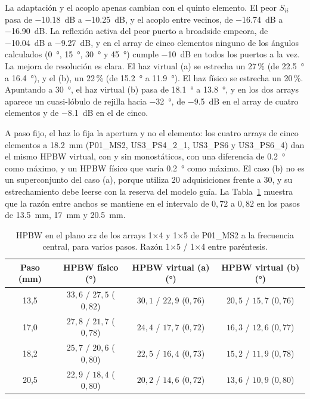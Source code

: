 \documentclass[11pt,a4paper]{article}
\begin{document}
La adaptación y el acoplo apenas cambian con el quinto elemento. El peor $S_{ii}$ pasa de \SI{-10.18}{dB} a \SI{-10.25}{dB}, y el acoplo entre vecinos, de \SI{-16.74}{dB} a \SI{-16.90}{dB}. La reflexión activa del peor puerto a broadside empeora, de \SI{-10.04}{dB} a \SI{-9.27}{dB}, y en el array de cinco elementos ninguno de los ángulos calculados (\SI{0}{\degree}, \SI{15}{\degree}, \SI{30}{\degree} y \SI{45}{\degree}) cumple \SI{-10}{dB} en todos los puertos a la vez. La mejora de resolución es clara. El haz virtual (a) se estrecha un 27\,\% (de \SI{22.5}{\degree} a \SI{16.4}{\degree}), y el (b), un 22\,\% (de \SI{15.2}{\degree} a \SI{11.9}{\degree}). El haz físico se estrecha un 20\,\%. Apuntando a \SI{30}{\degree}, el haz virtual (b) pasa de \SI{18.1}{\degree} a \SI{13.8}{\degree}, y en los dos arrays aparece un cuasi-lóbulo de rejilla hacia \SI{-32}{\degree}, de \SI{-9.5}{dB} en el array de cuatro elementos y de \SI{-8.1}{dB} en el de cinco.

A paso fijo, el haz lo fija la apertura y no el elemento: los cuatro arrays de cinco elementos a \SI{18.2}{mm} (P01\_MS2, US3\_PS4\_2\_1, US3\_PS6 y US3\_PS6\_4) dan el mismo HPBW virtual, con y sin monostáticos, con una diferencia de \SI{0.2}{\degree} como máximo, y un HPBW físico que varía \SI{0.2}{\degree} como máximo. El caso (b) no es un superconjunto del caso (a), porque utiliza 20 adquisiciones frente a 30, y su estrechamiento debe leerse con la reserva del modelo guía. La Tabla~\ref{tab:n_elementos_pasos} muestra que la razón entre anchos se mantiene en el intervalo de $0{,}72$ a $0{,}82$ en los pasos de \SI{13.5}{mm}, \SI{17}{mm} y \SI{20.5}{mm}.

\begin{table}[H]
    \centering
    \caption{HPBW en el plano $xz$ de los arrays 1$\times$4 y 1$\times$5 de P01\_MS2 a la frecuencia central, para varios pasos. Razón 1$\times$5 / 1$\times$4 entre paréntesis.}
    \label{tab:n_elementos_pasos}
    {\small
    \begin{tabular}{c c c c}
        \toprule
        Paso (\si{mm}) & HPBW físico (\si{\degree}) & HPBW virtual (a) (\si{\degree}) & HPBW virtual (b) (\si{\degree}) \\
        \midrule
        13,5 & $33{,}6$ / $27{,}5$ ($0{,}82$) & $30{,}1$ / $22{,}9$ ($0{,}76$) & $20{,}5$ / $15{,}7$ ($0{,}76$) \\
        17,0 & $27{,}8$ / $21{,}7$ ($0{,}78$) & $24{,}4$ / $17{,}7$ ($0{,}72$) & $16{,}3$ / $12{,}6$ ($0{,}77$) \\
        18,2 & $25{,}7$ / $20{,}6$ ($0{,}80$) & $22{,}5$ / $16{,}4$ ($0{,}73$) & $15{,}2$ / $11{,}9$ ($0{,}78$) \\
        20,5 & $22{,}9$ / $18{,}4$ ($0{,}80$) & $20{,}2$ / $14{,}6$ ($0{,}72$) & $13{,}6$ / $10{,}9$ ($0{,}80$) \\
        \bottomrule
    \end{tabular}
    }
\end{table}
\end{document}
